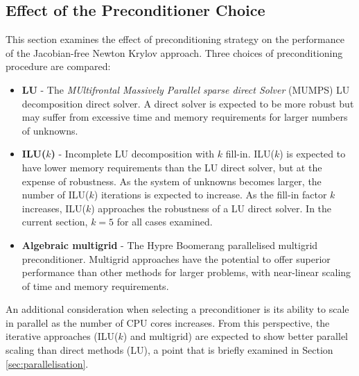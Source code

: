 \documentclass[sn-mathphys,Numbered]{sn-jnl}%
\begin{document}
\subsection{Effect of the Preconditioner Choice}
\label{sec:preconditioner}
This section examines the effect of preconditioning strategy on the performance of the Jacobian-free Newton Krylov approach.
Three choices of preconditioning procedure are compared:
\begin{itemize}
	\item \textbf{LU} - The \emph{MUltifrontal Massively Parallel sparse direct Solver} (MUMPS) \citep{MUMPS:1, MUMPS:2} LU decomposition direct solver. A direct solver is expected to be more robust but may suffer from excessive time and memory requirements for larger numbers of unknowns.
	\item \textbf{ILU($k$)} - Incomplete LU decomposition with $k$ fill-in. ILU($k$) is expected to have lower memory requirements than the LU direct solver, but at the expense of robustness.
	As the system of unknowns becomes larger, the number of ILU($k$) iterations is expected to increase. As the fill-in factor $k$ increases, ILU($k$) approaches the robustness of a LU direct solver. In the current section, $k = 5$ for all cases examined.
	\item \textbf{Algebraic multigrid} - The Hypre Boomerang \citep{hypre} parallelised multigrid preconditioner. Multigrid approaches have the potential to offer superior performance than other methods for larger problems, with near-linear scaling of time and memory requirements.
\end{itemize}

An additional consideration when selecting a preconditioner is its ability to scale in parallel as the number of CPU cores increases.
From this perspective, the iterative approaches (ILU($k$) and multigrid) are expected to show better parallel scaling than direct methods (LU), a point that is briefly examined in Section \ref{sec:parallelisation}.
\end{document}
